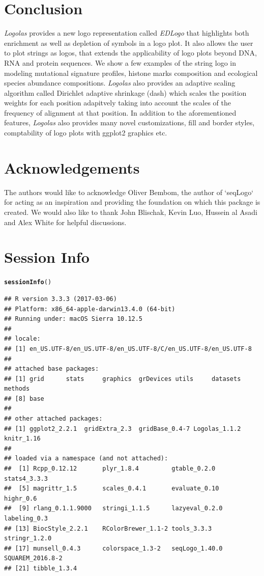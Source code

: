 \documentclass[12pt]{article}\usepackage[]{graphicx}\usepackage[usenames,dvipsnames]{color}
\makeatletter
\newcommand{\hlstd}[1]{\textcolor[rgb]{0.345,0.345,0.345}{#1}}%
\newcommand{\hlkwd}[1]{\textcolor[rgb]{0.737,0.353,0.396}{\textbf{#1}}}%
\newenvironment{kframe}{%
 \def\at@end@of@kframe{}%
 \ifinner\ifhmode%
  \def\at@end@of@kframe{\end{minipage}}%
  \begin{minipage}{\columnwidth}%
 \fi\fi%
 \def\FrameCommand##1{\hskip\@totalleftmargin \hskip-\fboxsep
 \colorbox{shadecolor}{##1}\hskip-\fboxsep
     \hskip-\linewidth \hskip-\@totalleftmargin \hskip\columnwidth}%
 \MakeFramed {\advance\hsize-\width
   \@totalleftmargin\z@ \linewidth\hsize
   \@setminipage}}%
 {\par\unskip\endMakeFramed%
 \at@end@of@kframe}
\newenvironment{knitrout}{}{} %
\newcommand{\Logolas}{\textit{Logolas}}
\makeatother
\begin{document}
\section{Conclusion}

\Logolas{} provides a new logo representation called \textit{EDLogo} that highlights both enrichment as well as depletion of symbols in a logo plot. It also allows the user to plot strings as logos, that extends the applicability of logo plots beyond DNA, RNA and protein sequences. We show a few examples of the string logo in modeling mutational signature profiles, histone marks composition and ecological species abundance compositions. \Logolas{} also provides an adaptive scaling algorithm called Dirichlet adaptive shrinkage (dash) which scales the position weights for each position adapitvely taking into account the scales of the frequency of alignment at that position. In addition to the aforementioned features, \Logolas{} also provides many novel customizations, fill and border styles, comptability of logo plots with ggplot2 graphics etc.

\section{Acknowledgements}

The authors would like to acknowledge Oliver Bembom, the author of `seqLogo` for acting as an inspiration and providing the foundation on which this package is created. We would also like to thank John Blischak, Kevin Luo, Hussein al Asadi and Alex White for helpful discussions.

\section{Session Info}

\begin{knitrout}
\color{fgcolor}\begin{kframe}
\begin{alltt}
\hlkwd{sessionInfo}\hlstd{()}
\end{alltt}
\begin{verbatim}
## R version 3.3.3 (2017-03-06)
## Platform: x86_64-apple-darwin13.4.0 (64-bit)
## Running under: macOS Sierra 10.12.5
## 
## locale:
## [1] en_US.UTF-8/en_US.UTF-8/en_US.UTF-8/C/en_US.UTF-8/en_US.UTF-8
## 
## attached base packages:
## [1] grid      stats     graphics  grDevices utils     datasets  methods  
## [8] base     
## 
## other attached packages:
## [1] ggplot2_2.2.1  gridExtra_2.3  gridBase_0.4-7 Logolas_1.1.2  knitr_1.16    
## 
## loaded via a namespace (and not attached):
##  [1] Rcpp_0.12.12       plyr_1.8.4         gtable_0.2.0       stats4_3.3.3      
##  [5] magrittr_1.5       scales_0.4.1       evaluate_0.10      highr_0.6         
##  [9] rlang_0.1.1.9000   stringi_1.1.5      lazyeval_0.2.0     labeling_0.3      
## [13] BiocStyle_2.2.1    RColorBrewer_1.1-2 tools_3.3.3        stringr_1.2.0     
## [17] munsell_0.4.3      colorspace_1.3-2   seqLogo_1.40.0     SQUAREM_2016.8-2  
## [21] tibble_1.3.4
\end{verbatim}
\end{kframe}
\end{knitrout}
\end{document}
